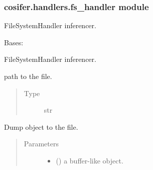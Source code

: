 \documentclass[letterpaper,10pt,english]{sphinxmanual}
\begin{document}
\subsubsection{cosifer.handlers.fs\_handler module}
\label{\detokenize{_modules/cosifer.handlers:module-cosifer.handlers.fs_handler}}\label{\detokenize{_modules/cosifer.handlers:cosifer-handlers-fs-handler-module}}
FileSystemHandler inferencer.

\begin{fulllineitems}
\label{\detokenize{_modules/cosifer.handlers:cosifer.handlers.fs_handler.FileSystemHandler}}
Bases: {\hyperref[\detokenize{_modules/cosifer.handlers:cosifer.handlers.file_handler.FileHandler}]{}}

FileSystemHandler inferencer.

\begin{fulllineitems}
\label{\detokenize{_modules/cosifer.handlers:cosifer.handlers.fs_handler.FileSystemHandler.filepath}}
path to the file.
\begin{quote}\begin{description}
\item[{Type}] \leavevmode
str

\end{description}\end{quote}

\end{fulllineitems}


\begin{fulllineitems}
\label{\detokenize{_modules/cosifer.handlers:cosifer.handlers.fs_handler.FileSystemHandler.dump}}
Dump object to the file.
\begin{quote}\begin{description}
\item[{Parameters}] \leavevmode\begin{itemize}
\item {} 
 () \textendash{} a buffer-like object.


\end{itemize}
\end{description}
\end{quote}
\end{fulllineitems}
\end{fulllineitems}
\end{document}
